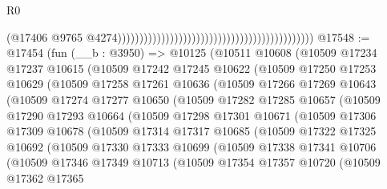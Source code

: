 \begin{lexlean}{R0}
\begin{coremodule}
                                                                                            (@17406
                                                                                              @9765
                                                                                              @4274)))))))))))))))))))))))))))))))))))))))))))))
@17548 := @17454
    (fun (__b : @3950) =>
    @10125
      (@10511
        @10608
        (@10509
          @17234
          @17237
          @10615
          (@10509
            @17242
            @17245
            @10622
            (@10509
              @17250
              @17253
              @10629
              (@10509
                @17258
                @17261
                @10636
                (@10509
                  @17266
                  @17269
                  @10643
                  (@10509
                    @17274
                    @17277
                    @10650
                    (@10509
                      @17282
                      @17285
                      @10657
                      (@10509
                        @17290
                        @17293
                        @10664
                        (@10509
                          @17298
                          @17301
                          @10671
                          (@10509
                            @17306
                            @17309
                            @10678
                            (@10509
                              @17314
                              @17317
                              @10685
                              (@10509
                                @17322
                                @17325
                                @10692
                                (@10509
                                  @17330
                                  @17333
                                  @10699
                                  (@10509
                                    @17338
                                    @17341
                                    @10706
                                    (@10509
                                      @17346
                                      @17349
                                      @10713
                                      (@10509
                                        @17354
                                        @17357
                                        @10720
                                        (@10509
                                          @17362
                                          @17365

\end{coremodule}
\end{lexlean}
